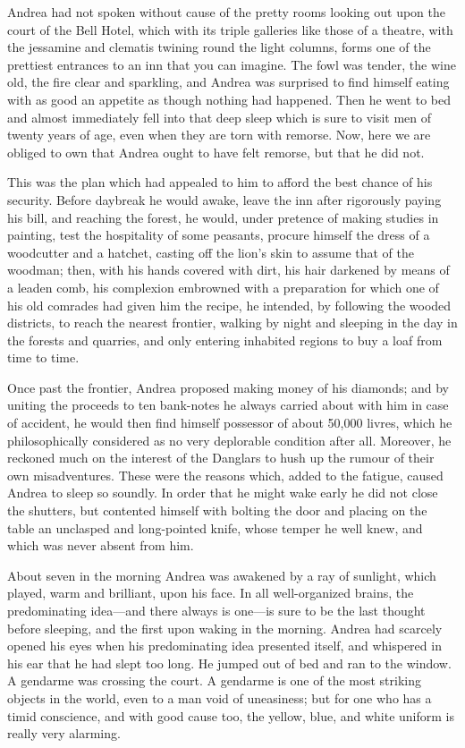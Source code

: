  Andrea had not spoken without cause of the pretty rooms looking out upon the court of the Bell Hotel, which with its triple galleries like those of a theatre, with the jessamine and clematis twining round the light columns, forms one of the prettiest entrances to an inn that you can imagine. The fowl was tender, the wine old, the fire clear and sparkling, and Andrea was surprised to find himself eating with as good an appetite as though nothing had happened. Then he went to bed and almost immediately fell into that deep sleep which is sure to visit men of twenty years of age, even when they are torn with remorse. Now, here we are obliged to own that Andrea ought to have felt remorse, but that he did not. 

 This was the plan which had appealed to him to afford the best chance of his security. Before daybreak he would awake, leave the inn after rigorously paying his bill, and reaching the forest, he would, under pretence of making studies in painting, test the hospitality of some peasants, procure himself the dress of a woodcutter and a hatchet, casting off the lion's skin to assume that of the woodman; then, with his hands covered with dirt, his hair darkened by means of a leaden comb, his complexion embrowned with a preparation for which one of his old comrades had given him the recipe, he intended, by following the wooded districts, to reach the nearest frontier, walking by night and sleeping in the day in the forests and quarries, and only entering inhabited regions to buy a loaf from time to time. 

 Once past the frontier, Andrea proposed making money of his diamonds; and by uniting the proceeds to ten bank-notes he always carried about with him in case of accident, he would then find himself possessor of about 50,000 livres, which he philosophically considered as no very deplorable condition after all. Moreover, he reckoned much on the interest of the Danglars to hush up the rumour of their own misadventures. These were the reasons which, added to the fatigue, caused Andrea to sleep so soundly. In order that he might wake early he did not close the shutters, but contented himself with bolting the door and placing on the table an unclasped and long-pointed knife, whose temper he well knew, and which was never absent from him. 

 About seven in the morning Andrea was awakened by a ray of sunlight, which played, warm and brilliant, upon his face. In all well-organized brains, the predominating idea—and there always is one—is sure to be the last thought before sleeping, and the first upon waking in the morning. Andrea had scarcely opened his eyes when his predominating idea presented itself, and whispered in his ear that he had slept too long. He jumped out of bed and ran to the window. A gendarme was crossing the court. A gendarme is one of the most striking objects in the world, even to a man void of uneasiness; but for one who has a timid conscience, and with good cause too, the yellow, blue, and white uniform is really very alarming. 


